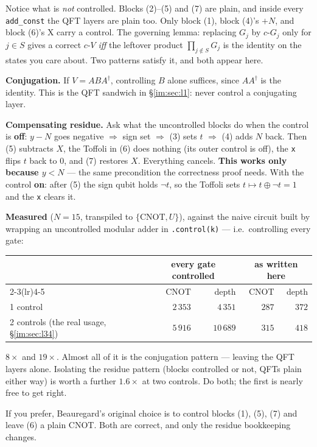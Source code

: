 \documentclass[11pt]{article}
\newcommand{\CNOT}{\mathrm{CNOT}}
\newcommand{\code}[1]{\texttt{#1}}
\theoremstyle{plain}
\theoremstyle{remark}
\begin{document}
\begin{keybox}[title={Where the control goes --- the biggest constant factor in the circuit}]
Notice what is \emph{not} controlled. Blocks (2)--(5) and (7) are plain, and inside every
\code{add\_const} the QFT layers are plain too. Only block (1), block (4)'s $+N$, and block (6)'s
X carry a control. The governing lemma: replacing $G_j$ by $c\text{-}G_j$ only for $j\in S$ gives
a correct $c\text{-}V$ \emph{iff} the leftover product $\prod_{j\notin S}G_j$ is the identity on
the states you care about. Two patterns satisfy it, and both appear here.

\textbf{Conjugation.} If $V=ABA^\dagger$, controlling $B$ alone suffices, since $AA^\dagger$ is the identity.
This is the QFT sandwich in \S\ref{im:sec:l1}: never control a conjugating layer.

\textbf{Compensating residue.} Ask what the uncontrolled blocks do when the control is
\textbf{off}: $y-N$ goes negative $\Rightarrow$ sign set $\Rightarrow$ (3) sets $t$ $\Rightarrow$
(4) adds $N$ back. Then (5) subtracts $X$, the Toffoli in (6) does nothing (its outer control is
off), the \code{x} flips $t$ back to $0$, and (7) restores $X$. Everything cancels.
\textbf{This works only because $y<N$} --- the same precondition the correctness proof needs.
With the control \textbf{on}: after (5) the sign qubit holds $\neg t$, so the Toffoli sets
$t\mapsto t\oplus\neg t=1$ and the \code{x} clears it.

\textbf{Measured} ($N=15$, transpiled to $\{\CNOT,U\}$), against the naive circuit built by
wrapping an uncontrolled modular adder in \code{.control(k)} --- i.e.\ controlling every gate:

\begin{center}\small
\begin{tabular}{@{}lrrrr@{}}
\toprule
& \multicolumn{2}{c}{every gate controlled} & \multicolumn{2}{c}{as written here}\\
\cmidrule(lr){2-3}\cmidrule(lr){4-5}
& CNOT & depth & CNOT & depth\\
\midrule
1 control & $2\,353$ & $4\,351$ & $287$ & $372$\\
2 controls (the real usage, \S\ref{im:sec:l34}) & $5\,916$ & $10\,689$ & $315$ & $418$\\
\bottomrule
\end{tabular}
\end{center}

\noindent
$8\times$ and $19\times$. Almost all of it is the conjugation pattern --- leaving the QFT layers
alone. Isolating the residue pattern (blocks controlled or not, QFTs plain either way) is worth a
further $1.6\times$ at two controls. Do both; the first is nearly free to get right.

If you prefer, Beauregard's original choice is to control blocks (1), (5), (7) and leave (6) a
plain CNOT. Both are correct, and only the residue bookkeeping changes.
\end{keybox}
\end{document}
